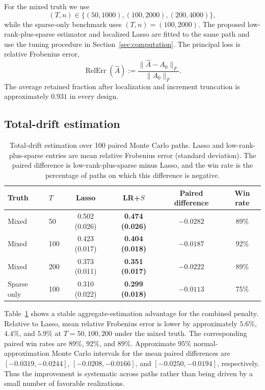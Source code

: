 \documentclass[12pt]{article}
\theoremstyle{definition}
\begin{document}
	For the mixed truth we use
	\[
	(T,n)\in\{(50,1000),(100,2000),(200,4000)\},
	\]
	while the sparse-only benchmark uses $(T,n)=(100,2000)$. The proposed low-rank-plus-sparse estimator and localized Lasso are fitted to the same path and use the tuning procedure in Section~\ref{sec:computation}. The principal loss is relative Frobenius error,
	\begin{equation}
		\operatorname{RelErr}(\widehat A)
		:=\frac{\|\widehat A-A_0\|_F}{\|A_0\|_F}.
		\label{eq:relative_error_sim}
	\end{equation}
	The average retained fraction after localization and increment truncation is approximately $0.931$ in every design.
	
	\subsection{Total-drift estimation}
	
	\begin{table}[ht]
		\centering
		\caption{Total-drift estimation over 100 paired Monte Carlo paths. Lasso and low-rank-plus-sparse entries are mean relative Frobenius error (standard deviation). The paired difference is low-rank-plus-sparse minus Lasso, and the win rate is the percentage of paths on which this difference is negative.}
		\label{tab:main_simulation}
		\small
		\begin{tabular}{llcccc}
			\toprule
			Truth & $T$ & Lasso & LR+$S$ & Paired difference & Win rate \\
			\midrule
			Mixed & 50
			& 0.502 (0.026) & \textbf{0.474 (0.026)} & $-0.0282$ & 89\% \\
			Mixed & 100
			& 0.423 (0.017) & \textbf{0.404 (0.018)} & $-0.0187$ & 92\% \\
			Mixed & 200
			& 0.373 (0.011) & \textbf{0.351 (0.017)} & $-0.0222$ & 89\% \\
			Sparse only & 100
			& 0.310 (0.022) & \textbf{0.299 (0.018)} & $-0.0113$ & 75\% \\
			\bottomrule
		\end{tabular}
	\end{table}
	
	Table~\ref{tab:main_simulation} shows a stable aggregate-estimation advantage for the combined penalty. Relative to Lasso, mean relative Frobenius error is lower by approximately $5.6\%$, $4.4\%$, and $5.9\%$ at $T=50,100,200$ under the mixed truth. The corresponding paired win rates are $89\%$, $92\%$, and $89\%$. Approximate 95\% normal-approximation Monte Carlo intervals for the mean paired differences are $[-0.0319,-0.0244]$, $[-0.0208,-0.0166]$, and $[-0.0250,-0.0194]$, respectively. Thus the improvement is systematic across paths rather than being driven by a small number of favorable realizations.
	
\end{document}
